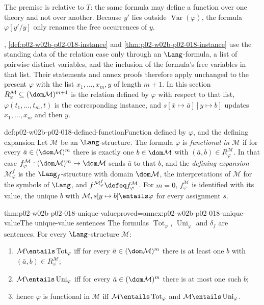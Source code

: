 The premise is relative to \(T\): the same formula may define a function
over one theory and not over another.  Because \(y'\) lies outside
\(\operatorname{Var}(\varphi)\), the formula \(\varphi[y'/y]\) only renames
the free occurrences of \(y\).

,
\cref{def:p02-w02b-p02-018-instance} and
\cref{thm:p02-w02b-p02-018-instance} use the standing data of the relation
case only through an \(\Lang\)-formula, a list of pairwise distinct
variables, and the inclusion of the formula's free variables in that list.
Their statements and annex proofs therefore apply unchanged to the present
\(\varphi\) with the list \(x_1,\ldots,x_m,y\) of length \(m+1\).  In this
section \(R^{\mathcal M}_{\varphi}\subseteq(\dom\mathcal M)^{m+1}\) is the
relation defined by \(\varphi\) with respect to that list,
\(\varphi(t_1,\ldots,t_m,t)\) is the corresponding instance, and
\(s[\bar x\mapsto\bar a][y\mapsto b]\) updates \(x_1,\ldots,x_m\) and then
\(y\).

\begin{hbdefinition}{def:p02-w02b-p02-018-defined-function}{Function defined by \(\varphi\), and the defining expansion}
Let \(\mathcal M\) be an \(\Lang\)-structure.  The formula \(\varphi\) is
\emph{functional in \(\mathcal M\)} if for every
\(\bar a\in(\dom\mathcal M)^m\) there is exactly one \(b\in\dom\mathcal M\)
with \((\bar a,b)\in R^{\mathcal M}_{\varphi}\).  In that case
\(f^{\mathcal M}_{\varphi}:(\dom\mathcal M)^m\to\dom\mathcal M\) sends
\(\bar a\) to that \(b\), and the \emph{defining expansion}
\(\mathcal M^{f}_{\varphi}\) is the \(\Lang_f\)-structure with domain
\(\dom\mathcal M\), the interpretations of \(\mathcal M\) for the symbols of
\(\Lang\), and \(f^{\mathcal M^{f}_{\varphi}}\defeq f^{\mathcal M}_{\varphi}\).
For \(m=0\), \(f^{\mathcal M}_{\varphi}\) is identified with its value, the
unique \(b\) with \(\mathcal M,s[y\mapsto b]\entails\varphi\) for every
assignment \(s\).
\end{hbdefinition}

\begin{hblemma}{thm:p02-w02b-p02-018-unique-value}{proved=annex:p02-w02b-p02-018-unique-value}{The unique-value sentences}
The formulas \(\operatorname{Tot}_{\varphi}\), \(\operatorname{Uni}_{\varphi}\)
and \(\delta_f\) are sentences.  For every \(\Lang\)-structure
\(\mathcal M\):
\begin{enumerate}
 \item \(\mathcal M\entails\operatorname{Tot}_{\varphi}\) iff for every
       \(\bar a\in(\dom\mathcal M)^m\) there is at least one \(b\) with
       \((\bar a,b)\in R^{\mathcal M}_{\varphi}\);
 \item \(\mathcal M\entails\operatorname{Uni}_{\varphi}\) iff for every
       \(\bar a\in(\dom\mathcal M)^m\) there is at most one such \(b\);
 \item hence \(\varphi\) is functional in \(\mathcal M\) iff
       \(\mathcal M\entails\operatorname{Tot}_{\varphi}\) and
       \(\mathcal M\entails\operatorname{Uni}_{\varphi}\).
\end{enumerate}
\end{hblemma}

